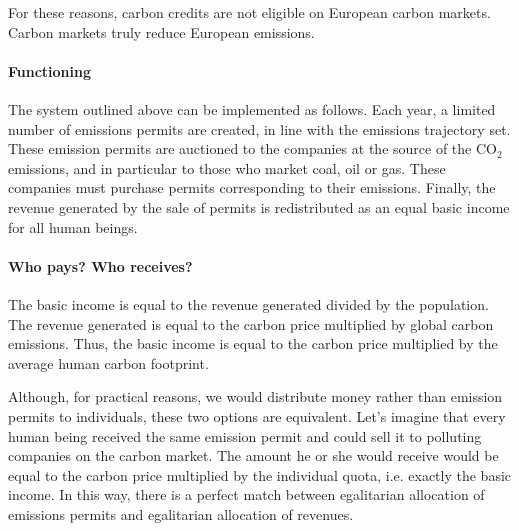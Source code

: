 \documentclass[a5paper,english,openany]{memoir}
\begin{document}
 For these reasons, carbon credits are not eligible on European carbon markets. Carbon markets truly reduce European emissions.


\paragraph{Functioning}
The system outlined above can be implemented as follows. Each year, a limited number of emissions permits are created, in line with the emissions trajectory set. These emission permits are auctioned to the companies at the source of the CO$_\text{2}$ emissions, and in particular to those who market %
coal, oil or gas. These companies must purchase permits corresponding to their emissions. Finally, the revenue generated by the sale of permits is redistributed as an equal basic income for all human beings. %

\paragraph{Who pays? Who receives?}
The basic income is equal to the revenue generated divided by the population. The revenue generated is equal to the carbon price multiplied by global carbon emissions. Thus, the basic income is equal to the carbon price multiplied by the average human carbon footprint. 

Although, for practical reasons, we would distribute money rather than emission permits to individuals, these two options are equivalent. Let's imagine that every human being received the same emission permit and could sell it to polluting companies on the carbon market. The amount he or she would receive would be equal to the carbon price multiplied by the individual quota, i.e. exactly the basic income. In this way, there is a perfect match between egalitarian allocation of emissions permits and egalitarian allocation of revenues. %
\end{document}
